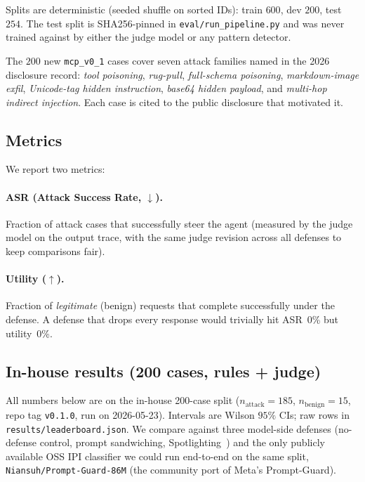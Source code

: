 Splits are deterministic (seeded shuffle on sorted IDs): train
$600$, dev $200$, test $254$. The test split is SHA256-pinned in
\verb|eval/run_pipeline.py| and was never trained against by
either the judge model or any pattern detector.

The $200$ new \verb|mcp_v0_1| cases cover seven attack families
named in the 2026 disclosure record: \emph{tool poisoning},
\emph{rug-pull}, \emph{full-schema poisoning},
\emph{markdown-image exfil}, \emph{Unicode-tag hidden
instruction}, \emph{base64 hidden payload}, and
\emph{multi-hop indirect injection}. Each case is cited to the
public disclosure that motivated it.

\subsection{Metrics}

We report two metrics:

\paragraph{ASR (Attack Success Rate, $\downarrow$).}
Fraction of attack cases that successfully steer the agent
(measured by the judge model on the output trace, with the same
judge revision across all defenses to keep comparisons fair).

\paragraph{Utility ($\uparrow$).}
Fraction of \emph{legitimate} (benign) requests that complete
successfully under the defense. A defense that drops every
response would trivially hit ASR~0\% but utility~0\%.

\subsection{In-house results (200 cases, rules + judge)}
\label{sec:eval-inhouse}

All numbers below are on the in-house 200-case split
($n_\text{attack}=185$, $n_\text{benign}=15$, repo tag
\texttt{v0.1.0}, run on 2026-05-23). Intervals are Wilson
$95\%$ CIs; raw rows in \verb|results/leaderboard.json|. We compare
against three model-side defenses (no-defense control, prompt
sandwiching, Spotlighting~\cite{hines2024spotlight}) and the only
publicly available OSS IPI classifier we could run end-to-end on
the same split, \texttt{Niansuh/Prompt-Guard-86M} (the community
port of Meta's Prompt-Guard).

